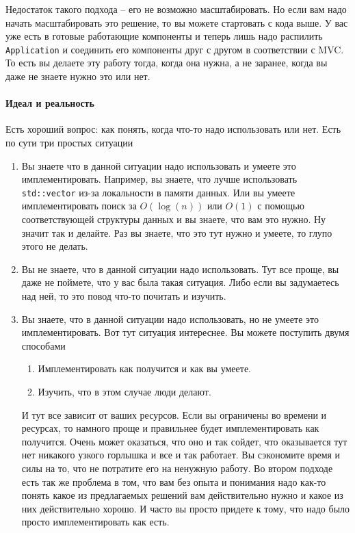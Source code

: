 Недостаток такого подхода -- его не возможно масштабировать.
Но если вам надо начать масштабировать это решение, то вы можете стартовать с кода выше.
У вас уже есть в готовые работающие компоненты и теперь лишь надо распилить \verb"Application" и соединить его компоненты  друг с другом в соответствии с MVC.
То есть вы делаете эту работу тогда, когда она нужна, а не заранее, когда вы даже не знаете нужно это или нет.

\paragraph{Идеал и реальность}

Есть хороший вопрос: как понять, когда что-то надо использовать или нет.
Есть по сути три простых ситуации
\begin{enumerate}
\item Вы знаете что в данной ситуации надо использовать и умеете это имплементировать.
Например, вы знаете, что лучше использовать \verb"std::vector" из-за локальности в памяти данных.
Или вы умеете имплементировать поиск за $O(\log(n))$ или $O(1)$ с помощью соответствующей структуры данных и вы знаете, что вам это нужно.
Ну значит так и делайте.
Раз вы знаете, что это тут нужно и умеете, то глупо этого не делать.

\item Вы не знаете, что в данной ситуации надо использовать.
Тут все проще, вы даже не поймете, что у вас была такая ситуация.
Либо если вы задумаетесь над ней, то это повод что-то почитать и изучить.

\item Вы знаете, что в данной ситуации надо использовать, но не умеете это имплементировать.
Вот тут ситуация интереснее.
Вы можете поступить двумя способами
\begin{enumerate}
\item Имплементировать как получится и как вы умеете.

\item Изучить, что в этом случае люди делают.
\end{enumerate}
И тут все зависит от ваших ресурсов.
Если вы ограничены во времени и ресурсах, то намного проще и правильнее будет имплементировать как получится.
Очень может оказаться, что оно и так сойдет, что оказывается тут нет никакого узкого горлышка и все и так работает.
Вы сэкономите время и силы на то, что не потратите его на ненужную работу.
Во втором подходе есть так же проблема в том, что вам без опыта и понимания надо как-то понять какое из предлагаемых решений вам действительно нужно и какое из них действительно хорошо.
И часто вы просто придете к тому, что надо было просто имплементировать как есть.
\end{enumerate}
